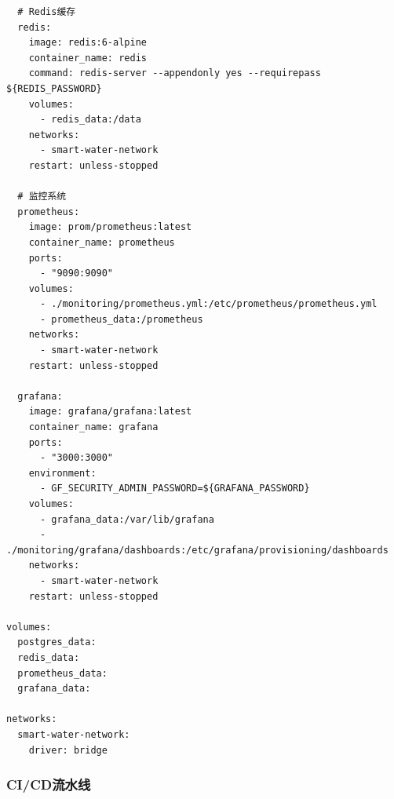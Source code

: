 \begin{lstlisting}
  # Redis缓存
  redis:
    image: redis:6-alpine
    container_name: redis
    command: redis-server --appendonly yes --requirepass ${REDIS_PASSWORD}
    volumes:
      - redis_data:/data
    networks:
      - smart-water-network
    restart: unless-stopped
    
  # 监控系统
  prometheus:
    image: prom/prometheus:latest
    container_name: prometheus
    ports:
      - "9090:9090"
    volumes:
      - ./monitoring/prometheus.yml:/etc/prometheus/prometheus.yml
      - prometheus_data:/prometheus
    networks:
      - smart-water-network
    restart: unless-stopped
    
  grafana:
    image: grafana/grafana:latest
    container_name: grafana
    ports:
      - "3000:3000"
    environment:
      - GF_SECURITY_ADMIN_PASSWORD=${GRAFANA_PASSWORD}
    volumes:
      - grafana_data:/var/lib/grafana
      - ./monitoring/grafana/dashboards:/etc/grafana/provisioning/dashboards
    networks:
      - smart-water-network
    restart: unless-stopped

volumes:
  postgres_data:
  redis_data:
  prometheus_data:
  grafana_data:

networks:
  smart-water-network:
    driver: bridge
\end{lstlisting}

\subsubsection{CI/CD流水线}\label{cicdux6d41ux6c34ux7ebf}

